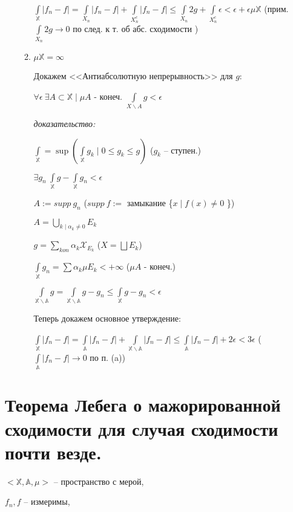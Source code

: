\documentclass[paper=a4, fontsize=13.2pt]{article}
\begin{document}
\begin{flushleft}
\begin{enumerate}
\begin{enumerate}
		$ \int\limits_{\mathbb{X}} |f_n - f| =
		\int\limits_{X_n} |f_n - f| + \int\limits_{X_n^c} |f_n - f| \leq
		\int\limits_{X_n} 2g + \int\limits_{X_n^c} \epsilon < \epsilon + \epsilon \mu \mathbb{X} $ (прим. $ \int\limits_{X_n} 2g \rightarrow 0 $ по след. к т. об абс. сходимости )

		\item $ \mu \mathbb{X} = \infty $

		Докажем <<Антиабсолютную непрерывность>> для $ g $:

		$ \forall \epsilon ~ \exists A \subset \mathbb{X} \mid \mu A$ - конеч.
		$ \int\limits_{X\backslash A} g < \epsilon $

		\textit{доказательство:}

		$ \int\limits_{\mathbb{X}} = \sup ( \int\limits_{\mathbb{X}} g_k \mid 0 \leq g_k \leq g) $ ($ g_k $ -- ступен.)

		$ \exists g_n ~ \int\limits_{\mathbb{X}} g - \int\limits_{\mathbb{X}} g_n < \epsilon $

		$ A:= supp\ g_n $ ($ supp\ f := $ замыкание \{$ x \mid f(x) \neq 0$ \})

		$ A =  \bigcup\limits_{k \mid \alpha_k \neq 0} E_k $

		$ g = \sum\limits_{kon} \alpha_k \mathcal{X}_{E_k} $ ($ X = \bigsqcup E_k $)

		$ \int\limits_{\mathbb{X}} g_n  = \sum \alpha_k \mu E_k  < +\infty $ ($ \mu A $ - конеч.)

		$ \int\limits_{\mathbb{X\backslash A}} g =
		\int\limits_{\mathbb{X\backslash A}} g - g_n \leq
		\int\limits_{\mathbb{X}} g - g_n < \epsilon $

		Теперь докажем основное утверждение:

		 $ \int\limits_{\mathbb{X}} |f_n - f| =
		 \int\limits_{\mathbb{A}} |f_n - f| + \int\limits_{\mathbb{X\backslash A}} |f_n - f| \leq
		 \int\limits_{\mathbb{A}} |f_n - f| + 2\epsilon < 3 \epsilon $
		 ($  \int\limits_{\mathbb{A}} |f_n - f| \rightarrow 0$  по п. (a))
	\end{enumerate}
\end{enumerate}
\end{flushleft}
\section{Теорема Лебега о мажорированной сходимости для случая сходимости почти везде.}
$<\mathds{X}, \mathds{A}, \mu>$ -- пространство с мерой,

$f_n, f$ -- измеримы,
\end{document}
